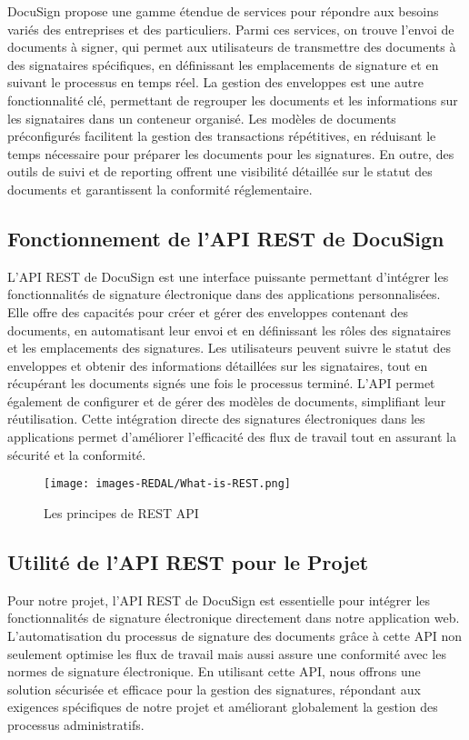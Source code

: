 DocuSign propose une gamme étendue de services pour répondre aux besoins variés des entreprises et des particuliers. Parmi ces services, on trouve l'envoi de documents à signer, qui permet aux utilisateurs de transmettre des documents à des signataires spécifiques, en définissant les emplacements de signature et en suivant le processus en temps réel. La gestion des enveloppes est une autre fonctionnalité clé, permettant de regrouper les documents et les informations sur les signataires dans un conteneur organisé. Les modèles de documents préconfigurés facilitent la gestion des transactions répétitives, en réduisant le temps nécessaire pour préparer les documents pour les signatures. En outre, des outils de suivi et de reporting offrent une visibilité détaillée sur le statut des documents et garantissent la conformité réglementaire.

\subsection{Fonctionnement de l'API REST de DocuSign}
L'API REST de DocuSign est une interface puissante permettant d'intégrer les fonctionnalités de signature électronique dans des applications personnalisées. Elle offre des capacités pour créer et gérer des enveloppes contenant des documents, en automatisant leur envoi et en définissant les rôles des signataires et les emplacements des signatures. Les utilisateurs peuvent suivre le statut des enveloppes et obtenir des informations détaillées sur les signataires, tout en récupérant les documents signés une fois le processus terminé. L'API permet également de configurer et de gérer des modèles de documents, simplifiant leur réutilisation. Cette intégration directe des signatures électroniques dans les applications permet d'améliorer l'efficacité des flux de travail tout en assurant la sécurité et la conformité.


\begin{figure}[H]
\begin{center}
\texttt{[image: images-REDAL/What-is-REST.png]}
\end{center}
\caption{Les principes de REST API}
\end{figure}




\subsection{Utilité de l'API REST pour le Projet}
Pour notre projet, l'API REST de DocuSign est essentielle pour intégrer les fonctionnalités de signature électronique directement dans notre application web. L'automatisation du processus de signature des documents grâce à cette API non seulement optimise les flux de travail mais aussi assure une conformité avec les normes de signature électronique. En utilisant cette API, nous offrons une solution sécurisée et efficace pour la gestion des signatures, répondant aux exigences spécifiques de notre projet et améliorant globalement la gestion des processus administratifs.

